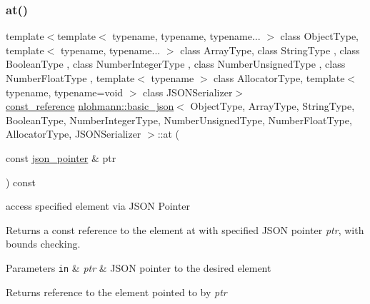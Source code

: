 \subsubsection{\texorpdfstring{at()}{at()}\hspace{0.1cm}{\footnotesize\ttfamily [6/6]}}
{\footnotesize\ttfamily template$<$template$<$ typename, typename, typename... $>$ class Object\+Type, template$<$ typename, typename... $>$ class Array\+Type, class String\+Type , class Boolean\+Type , class Number\+Integer\+Type , class Number\+Unsigned\+Type , class Number\+Float\+Type , template$<$ typename $>$ class Allocator\+Type, template$<$ typename, typename=void $>$ class J\+S\+O\+N\+Serializer$>$ \\
\hyperlink{classnlohmann_1_1basic__json_a4057c5425f4faacfe39a8046871786ca}{const\+\_\+reference} \hyperlink{classnlohmann_1_1basic__json}{nlohmann\+::basic\+\_\+json}$<$ Object\+Type, Array\+Type, String\+Type, Boolean\+Type, Number\+Integer\+Type, Number\+Unsigned\+Type, Number\+Float\+Type, Allocator\+Type, J\+S\+O\+N\+Serializer $>$\+::at (\begin{DoxyParamCaption}\item[{const \hyperlink{classnlohmann_1_1basic__json_a6886a5001f5b449ad316101a311ce536}{json\+\_\+pointer} \&}]{ptr }\end{DoxyParamCaption}) const\hspace{0.3cm}{\ttfamily [inline]}}



access specified element via J\+S\+ON Pointer 

Returns a const reference to the element at with specified J\+S\+ON pointer {\itshape ptr}, with bounds checking.


\begin{DoxyParams}[1]{Parameters}
\mbox{\tt in}  & {\em ptr} & J\+S\+ON pointer to the desired element\\
\hline
\end{DoxyParams}
\begin{DoxyReturn}{Returns}
reference to the element pointed to by {\itshape ptr} 
\end{DoxyReturn}


